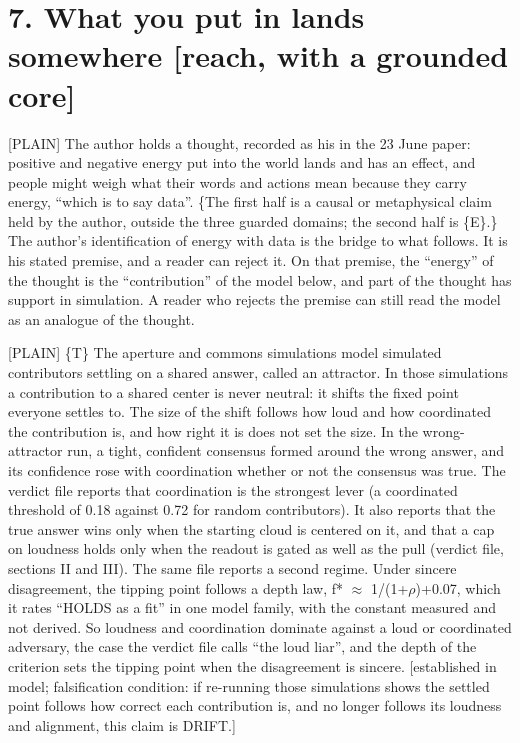 \documentclass[11pt]{article}
\newcommand{\register}[1]{{\ttfamily\small #1}}
\begin{document}
\section*{7. What you put in lands somewhere [reach, with a grounded core]}

\register{[PLAIN]} The author holds a thought, recorded as his in the 23 June paper: positive and negative energy put into the world lands and has an effect, and people might weigh what their words and actions mean because they carry energy, ``which is to say data''. \{The first half is a causal or metaphysical claim held by the author, outside the three guarded domains; the second half is \{E\}.\} The author's identification of energy with data is the bridge to what follows. It is his stated premise, and a reader can reject it. On that premise, the ``energy'' of the thought is the ``contribution'' of the model below, and part of the thought has support in simulation. A reader who rejects the premise can still read the model as an analogue of the thought.

\register{[PLAIN]} \{T\} The aperture and commons simulations model simulated contributors settling on a shared answer, called an attractor. In those simulations a contribution to a shared center is never neutral: it shifts the fixed point everyone settles to. The size of the shift follows how loud and how coordinated the contribution is, and how right it is does not set the size. In the wrong-attractor run, a tight, confident consensus formed around the wrong answer, and its confidence rose with coordination whether or not the consensus was true. The verdict file reports that coordination is the strongest lever (a coordinated threshold of 0.18 against 0.72 for random contributors). It also reports that the true answer wins only when the starting cloud is centered on it, and that a cap on loudness holds only when the readout is gated as well as the pull (verdict file, sections II and III). The same file reports a second regime. Under sincere disagreement, the tipping point follows a depth law, f* \ensuremath{\approx} 1/\allowbreak{}(1+\ensuremath{\rho})+0.07, which it rates ``HOLDS as a fit'' in one model family, with the constant measured and not derived. So loudness and coordination dominate against a loud or coordinated adversary, the case the verdict file calls ``the loud liar'', and the depth of the criterion sets the tipping point when the disagreement is sincere. [established in model; falsification condition: if re-running those simulations shows the settled point follows how correct each contribution is, and no longer follows its loudness and alignment, this claim is DRIFT.]
\end{document}
